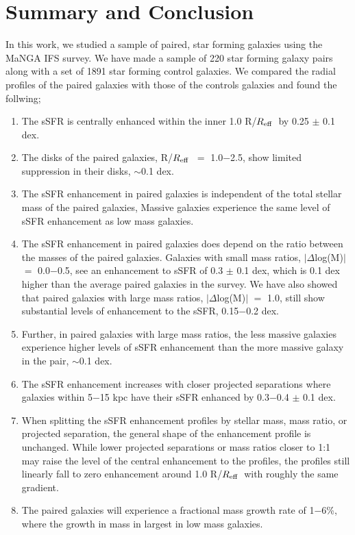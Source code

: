 \documentclass[iop,revtex4,twocolumn,apj,numberedappendix,appendixfloats]{emulateapj}
\newcommand{\reff}{$R_{\rm eff}$}
\begin{document}
\section{Summary and Conclusion}\label{sec:sum}

In this work, we studied a sample of paired, star forming galaxies using the MaNGA IFS survey. We have made a sample of 220 star forming galaxy pairs along with a set of 1891 star forming control galaxies. We compared the radial profiles of the paired galaxies with those of the controls galaxies and found the follwing;

\begin{enumerate}
\item The sSFR is centrally enhanced within the inner 1.0 R/\reff\ by 0.25 $\pm$ 0.1 dex. 
\item The disks of the paired galaxies, R/\reff\ $=$ 1.0$-$2.5, show limited suppression in their disks, $\sim$0.1 dex.
\item The sSFR enhancement in paired galaxies is independent of the total stellar mass of the paired galaxies, Massive galaxies experience the same level of sSFR enhancement as low mass galaxies.
\item The sSFR enhancement in paired galaxies does depend on the ratio between the masses of the paired galaxies. Galaxies with small mass ratios, $|\Delta$log(M)$|$ $=$ 0.0$-$0.5, see an enhancement to sSFR of 0.3 $\pm$ 0.1 dex, which is 0.1 dex higher than the average paired galaxies in the survey. We have also showed that paired galaxies with large mass ratios, $|\Delta$log(M)$|$ $=$ 1.0, still show substantial levels of enhancement to the sSFR, 0.15$-$0.2 dex. 
\item Further, in paired galaxies with large mass ratios, the less massive galaxies experience higher levels of sSFR enhancement than the more massive galaxy in the pair, $\sim$0.1 dex.
\item The sSFR enhancement increases with closer projected separations where galaxies within 5$-$15 kpc have their sSFR enhanced by 0.3$-$0.4 $\pm$ 0.1 dex. 
\item When splitting the sSFR enhancement profiles by stellar mass, mass ratio, or projected separation, the general shape of the enhancement profile is unchanged. While lower projected separations or mass ratios closer to 1:1 may raise the level of the central enhancement to the profiles, the profiles still linearly fall to zero enhancement around 1.0 R/\reff\ with roughly the same gradient.
\item The paired galaxies will experience a fractional mass growth rate of 1$-$6\%, where the growth in mass in largest in low mass galaxies.

\end{enumerate}
\end{document}
